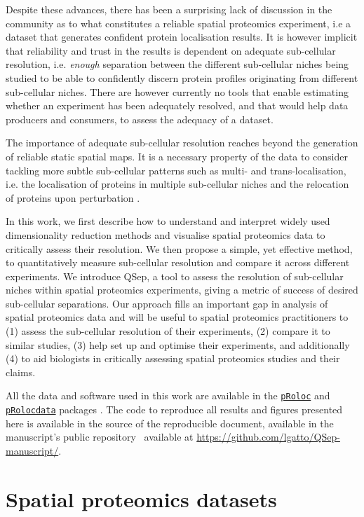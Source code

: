\documentclass[12pt]{article}\usepackage[]{graphicx}\usepackage[]{color}
\newcommand{\Rpackage}[1]{\texttt{#1}}
\newcommand\Biocpkg[1]{%
  {\href{http://bioconductor.org/packages/#1}%
    {\Rpackage{#1}}}}
\newcommand\Biocexptpkg[1]{\Biocpkg{#1}}
\begin{document}
Despite these advances, there has been a surprising lack of discussion
in the community as to what constitutes a reliable spatial proteomics
experiment, i.e a dataset that generates confident protein
localisation results. It is however implicit that reliability and
trust in the results is dependent on adequate sub-cellular resolution,
i.e. \textit{enough} separation between the different sub-cellular
niches being studied to be able to confidently discern protein
profiles originating from different sub-cellular niches. There are
however currently no tools that enable estimating whether an
experiment has been adequately resolved, and that would help data
producers and consumers, to assess the adequacy of a dataset.


The importance of adequate sub-cellular resolution reaches beyond the
generation of reliable static spatial maps. It is a necessary property
of the data to consider tackling more subtle sub-cellular patterns
such as multi- and trans-localisation, i.e. the localisation of
proteins in multiple sub-cellular niches and the relocation of
proteins upon perturbation \citep{Gatto:2014}.

\bigskip

In this work, we first describe how to understand and interpret widely
used dimensionality reduction methods and visualise spatial proteomics
data to critically assess their resolution. We then propose a simple,
yet effective method, to quantitatively measure sub-cellular
resolution and compare it across different experiments. We introduce
QSep, a tool to assess the resolution of sub-cellular niches within
spatial proteomics experiments, giving a metric of success of desired
sub-cellular separations. Our approach fills an important gap in
analysis of spatial proteomics data and will be useful to spatial
proteomics practitioners to (1) assess the sub-cellular resolution of
their experiments, (2) compare it to similar studies, (3) help set up
and optimise their experiments, and additionally (4) to aid biologists
in critically assessing spatial proteomics studies and their claims.

All the data and software used in this work are available in the
\Biocpkg{pRoloc} and \Biocexptpkg{pRolocdata} packages
\citep{Gatto:2014a}. The code to reproduce all results and figures
presented here is available in the source of the reproducible
document, available in the manuscript's public
repository~\cite{qseprepo} available at
\url{https://github.com/lgatto/QSep-manuscript/}.

\section{Spatial proteomics datasets}\label{sec:pdata}
\end{document}
